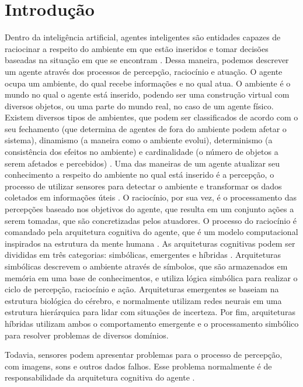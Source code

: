 \chapter{Introdução}

Dentro da inteligência artificial, agentes inteligentes são entidades capazes de raciocinar a respeito do ambiente em que estão inseridos e tomar decisões baseadas na situação em que se encontram \cite{russell2016artificial}. Dessa maneira, podemos descrever um agente através dos processos de percepção, raciocínio e atuação. O agente ocupa um ambiente, do qual recebe informações e no qual atua. O ambiente é o mundo no qual o agente está inserido, podendo ser uma construção virtual com diversos objetos, ou uma parte do mundo real, no caso de um agente físico. Existem diversos tipos de ambientes, que podem ser classificados de acordo com o seu fechamento (que determina de agentes de fora do ambiente podem afetar o sistema), dinamismo (a maneira como o ambiente evolui), determinismo (a consistência dos efeitos no ambiente) e cardinalidade (o número de objetos a serem afetados e percebidos) \cite{moya2007towards}. Uma das maneiras de um agente atualizar seu conhecimento a respeito do ambiente no qual está inserido é a percepção, o processo de utilizar sensores para detectar o ambiente e transformar os dados coletados em informações úteis \cite{weyns2004towards}.  O raciocínio, por sua vez, é o processamento das percepções baseado nos objetivos do agente, que resulta em um conjunto ações a serem tomadas, que são concretizadas pelos atuadores. O processo do raciocínio é comandado pela arquitetura cognitiva do agente, que é um modelo computacional inspirados na estrutura da mente humana \cite{DYACHENKO2018130}. As arquiteturas cognitivas podem ser divididas em três categorias: simbólicas, emergentes e híbridas \cite{yeCognitivearchitectures}. Arquiteturas simbólicas descrevem o ambiente através de símbolos, que são armazenados em memória em uma base de conhecimentos, e utiliza lógica simbólica para realizar o ciclo de percepção, raciocínio e ação. Arquiteturas emergentes se baseiam na estrutura biológica do cérebro, e normalmente utilizam redes neurais em uma estrutura hierárquica para lidar com situações de incerteza. Por fim, arquiteturas híbridas utilizam ambos o comportamento emergente e o processamento simbólico para resolver problemas de diversos domínios. 

Todavia, sensores podem apresentar problemas para o processo de percepção, com imagens, sons e outros dados falhos. Esse problema normalmente é de responsabilidade da arquitetura cognitiva do agente \cite{langley2009cognitive}.

